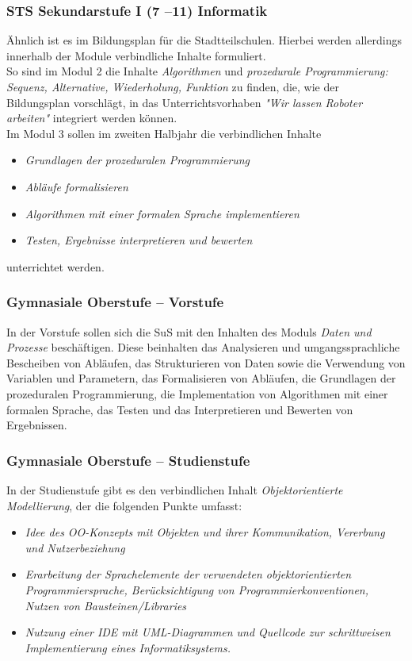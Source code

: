 \documentclass[paper=a4, pagesize, DIV=calc, BCOR=12.5mm, twoside=on, onecolumn=on, open = any, titlepage =on, parskip =half-, headsepline = on, footsepline = on, chapterprefix = on, appendixprefix = off, fontsize = 12pt, numbers = noenddot, abstract = on]{scrbook}
\numberwithin{equation}{chapter}
\theoremstyle{definition}
\theoremstyle{plain}
\theoremstyle{plain}
\theoremstyle{remark}
\theoremstyle{plain}
\theoremstyle{plain}
\begin{document}
\subsubsection{STS Sekundarstufe I (7 --11) Informatik}
Ähnlich ist es im Bildungsplan für die Stadtteilschulen. Hierbei werden allerdings innerhalb der Module verbindliche Inhalte formuliert.\\
So sind im Modul 2 die Inhalte \emph{Algorithmen} und \emph{prozedurale Programmierung: Sequenz, Alternative, Wiederholung, Funktion} zu finden, die, wie der Bildungsplan vorschlägt, in das Unterrichtsvorhaben \emph{"Wir lassen Roboter arbeiten"} integriert werden können.\\
Im Modul 3 sollen im zweiten Halbjahr die verbindlichen Inhalte
\begin{itemize}
\item \emph{Grundlagen der prozeduralen Programmierung}
\item \emph{Abläufe formalisieren}
\item \emph{Algorithmen mit einer formalen Sprache implementieren}
\item \emph{Testen, Ergebnisse interpretieren und bewerten}
\end{itemize}
unterrichtet werden. 

\subsubsection{Gymnasiale Oberstufe -- Vorstufe}

In der Vorstufe sollen sich die SuS mit den Inhalten des Moduls \emph{Daten und Prozesse} beschäftigen. Diese beinhalten das Analysieren und umgangssprachliche Bescheiben von Abläufen, das Strukturieren von Daten sowie die Verwendung von Variablen und Parametern, das Formalisieren von Abläufen, die Grundlagen der prozeduralen Programmierung, die Implementation von Algorithmen mit einer formalen Sprache, das Testen und das Interpretieren und Bewerten von Ergebnissen. 

\subsubsection{Gymnasiale Oberstufe -- Studienstufe}

In der Studienstufe gibt es den verbindlichen Inhalt \emph{Objektorientierte Modellierung}, der die folgenden Punkte umfasst:\\
\begin{itemize}
\item \emph{Idee des OO-Konzepts mit Objekten und ihrer Kommunikation, Vererbung und Nutzerbeziehung}
\item \emph{Erarbeitung der Sprachelemente der verwendeten objektorientierten Programmiersprache, Berücksichtigung von Programmierkonventionen, Nutzen von Bausteinen/Libraries}
\item \emph{Nutzung einer IDE mit UML-Diagrammen und Quellcode zur schrittweisen Implementierung eines Informatiksystems.}
\end{itemize}
\end{document}

